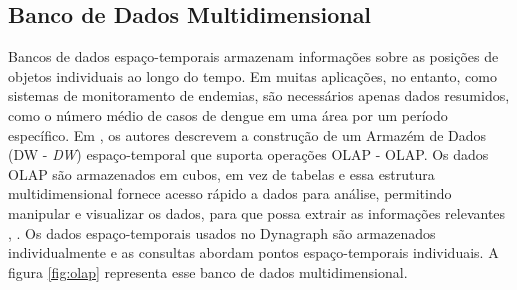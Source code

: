 \subsection{Banco de Dados Multidimensional}
Bancos de dados espaço-temporais armazenam informações sobre as posições de objetos individuais ao longo do tempo. Em muitas aplicações, no entanto, como sistemas de monitoramento de endemias, são necessários apenas dados resumidos, como o número médio de casos de dengue em uma área por um período específico.
Em \cite{Papadias2002}, os autores descrevem a construção de um Armazém de Dados (\acrshort{DW} - \textit{\acrlong{DW}}) espaço-temporal que suporta operações \acrshort{OLAP} - \acrlong{OLAP}. Os dados \acrshort{OLAP} são armazenados em cubos, em vez de tabelas e essa estrutura multidimensional fornece acesso rápido a dados para análise, permitindo manipular e visualizar os dados, para que possa extrair as informações relevantes \cite{faghmous2013}, \cite{Mitsa:2010}. Os dados espaço-temporais usados no Dynagraph são armazenados individualmente e as consultas abordam pontos espaço-temporais individuais. A figura \ref{fig:olap} representa esse banco de dados multidimensional.

\begin{figure}[!ht]
	\centering	
\end{figure}
\FloatBarrier